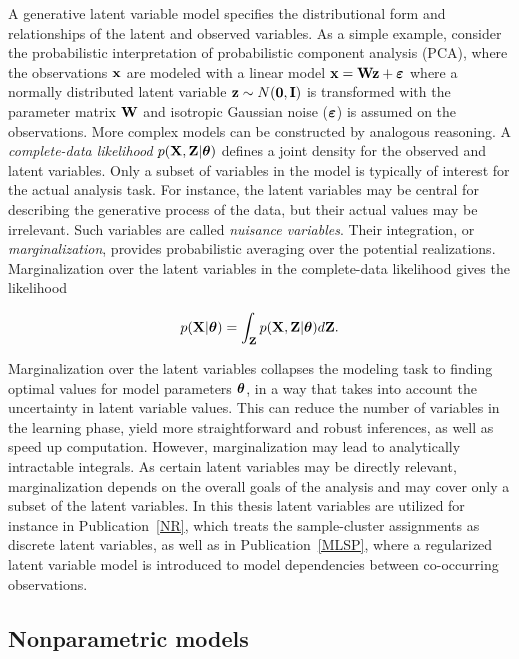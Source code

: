 A generative latent variable model specifies the distributional form
and relationships of the latent and observed variables. As a simple
example, consider the probabilistic interpretation of probabilistic
component analysis (PCA), where the observations \(\mathbf{x}\) are modeled
with a linear model \(\mathbf{x} = \mathbf{W}\mathbf{z} + \boldsymbol{\varepsilon}\) where a normally
distributed latent variable \(\mathbf{z} \sim N(\mathbf{0}, \mathbf{I})\) is transformed with
the parameter matrix \(\mathbf{W}\) and isotropic Gaussian noise
(\(\boldsymbol{\varepsilon}\)) is assumed on the observations. More complex models can
be constructed by analogous reasoning. A {\it complete-data
  likelihood} \(p(\mathbf{X},\mathbf{Z}|\boldsymbol{\theta})\) defines a joint density for the
observed and latent variables. Only a subset of variables in the model
is typically of interest for the actual analysis task. For instance,
the latent variables may be central for describing the generative
process of the data, but their actual values may be irrelevant. Such
variables are called {\it nuisance variables}. Their integration, or
{\em marginalization}, provides probabilistic averaging over the
potential realizations.  Marginalization over the latent variables in
the complete-data likelihood gives the likelihood

\begin{equation}\label{eq:marginalization}
  p(\mathbf{X}|\boldsymbol{\theta})=\int_{\mathbf{Z}} p(\mathbf{X},\mathbf{Z}|\boldsymbol{\theta})d\mathbf{Z}.
\end{equation}

Marginalization over the latent variables collapses the modeling task
to finding optimal values for model parameters \(\boldsymbol{\theta}\), in a way that
takes into account the uncertainty in latent variable values. This can
reduce the number of variables in the learning phase, yield more
straightforward and robust inferences, as well as speed up
computation. However, marginalization may lead to analytically
intractable integrals. As certain latent variables may be directly
relevant, marginalization depends on the overall goals of the analysis
and may cover only a subset of the latent variables. In this thesis
latent variables are utilized for instance in Publication~\ref{NR},
which treats the sample-cluster assignments as discrete latent
variables, as well as in Publication~\ref{MLSP}, where a regularized
latent variable model is introduced to model dependencies between
co-occurring observations.


\subsection{Nonparametric models}\label{sec:nonparametric}

